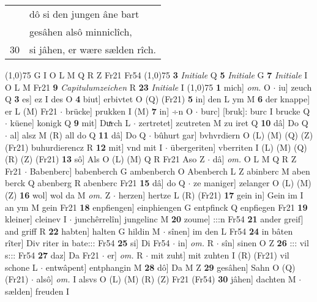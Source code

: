 \documentclass[8pt,a4paper,notitlepage]{article}
\begin{document}
\begin{table}[ht]
\begin{minipage}[t]{0.5\linewidth}
\begin{tabular}{rl}
 & dô si den jungen âne bart\\ 
 & gesâhen alsô minniclîch,\\ 
30 & si jâhen, er wære sælden rîch.\\ 
\end{tabular}
\scriptsize
\line(1,0){75} \newline
G I O L M Q R Z Fr21 Fr54 \newline
\line(1,0){75} \newline
\textbf{3} \textit{Initiale} Q  \textbf{5} \textit{Initiale} G  \textbf{7} \textit{Initiale} I O L M Fr21  \textbf{9} \textit{Capitulumzeichen} R  \textbf{23} \textit{Initiale} I  \newline
\line(1,0){75} \newline
\textbf{1} mich] \textit{om.} O  $\cdot$ iu] zeuch Q \textbf{3} es] ez I des O \textbf{4} biut] erbivtet O (Q) (Fr21) \textbf{5} in] den L ym M \textbf{6} der knappe] er L (M) Fr21  $\cdot$ brücke] prukken I (M) \textbf{7} in] ÷n O  $\cdot$ burc] [bruk]: burc I brucke Q  $\cdot$ küene] konigk Q \textbf{9} mit] Duͯrch L  $\cdot$ zertretet] zcutreten M zu iret Q \textbf{10} dâ] Do Q  $\cdot$ al] alsz M (R) all do Q \textbf{11} dâ] Do Q  $\cdot$ bûhurt gar] bvhvrdiern O (L) (M) (Q) (Z) (Fr21) buhurdierencz R \textbf{12} mit] vnd mit I  $\cdot$ übergeriten] vberriten I (L) (M) (Q) (R) (Z) (Fr21) \textbf{13} sô] Als O (L) (M) Q R Fr21 Aso Z  $\cdot$ dâ] \textit{om.} O L M Q R Z Fr21  $\cdot$ Babenberc] babenberch G ambenberch O Abenberch L Z abinberc M aben berck Q abenberg R abenberc Fr21 \textbf{15} dâ] do Q  $\cdot$ ze maniger] zelanger O (L) (M) (Z) \textbf{16} wol] wol da M \textit{om.} Z  $\cdot$ herzen] hertze L (R) (Fr21) \textbf{17} gein in] Gein im I an ym M gein Fr21 \textbf{18} enpfiengen] einphiengen G entpfinck Q enpfiegen Fr21 \textbf{19} kleiner] cleinev I  $\cdot$ junchêrrelîn] jungelinc M \textbf{20} zoume] :::n Fr54 \textbf{21} ander greif] and griff R \textbf{22} habten] halten G hildin M  $\cdot$ sînen] im den L Fr54 \textbf{24} in bâten rîter] Div riter in bate::: Fr54 \textbf{25} si] Di Fr54  $\cdot$ in] \textit{om.} R  $\cdot$ sîn] sinen O Z \textbf{26} ::: vil s::: Fr54 \textbf{27} daz] Da Fr21  $\cdot$ er] \textit{om.} R  $\cdot$ mit zuht] mit zuhten I (R) (Fr21) vil schone L  $\cdot$ entwâpent] entphangin M \textbf{28} dô] Da M Z \textbf{29} gesâhen] Sahn O (Q) (Fr21)  $\cdot$ alsô] \textit{om.} I alsvs O (L) (M) (R) (Z) Fr21 (Fr54) \textbf{30} jâhen] dachten M  $\cdot$ sælden] freuden I \newline
\end{minipage}

\end{table}
\end{document}
